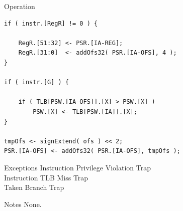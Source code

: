 \begin{iPageDescOpEntry}{Operation}
\begin{lstlisting}[style=iPageOpStyle]
if ( instr.[RegR] != 0 ) {
	
	RegR.[51:32] <- PSR.[IA-REG];
	RegR.[31:0]  <- addOfs32( PSR.[IA-OFS], 4 );
}

if ( instr.[G] ) {
    
    if ( TLB[PSW.[IA-OFS]].[X] > PSW.[X] ) 
        PSW.[X] <- TLB[PSW.[IA]].[X];
}

tmpOfs <- signExtend( ofs ) << 2;
PSR.[IA-OFS] <- addOfs32( PSR.[IA-OFS], tmpOfs );
\end{lstlisting}
\end{iPageDescOpEntry}

\begin{iPageDescEntry}{Exceptions}{
  Instruction Privilege Violation Trap \\
  Instruction TLB Miss Trap \\
  Taken Branch Trap
}
\end{iPageDescEntry}

\begin{iPageDescEntry}{Notes}{
  None.
}
\end{iPageDescEntry}

